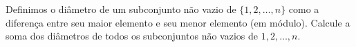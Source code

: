 Definimos o diâmetro de um subconjunto não vazio de $\{1, 2,\dots , n\}$ como a diferença entre seu maior elemento e seu menor elemento (em módulo).
Calcule a soma dos diâmetros de todos os subconjuntos não vazios de ${1, 2,\dots , n}$.
